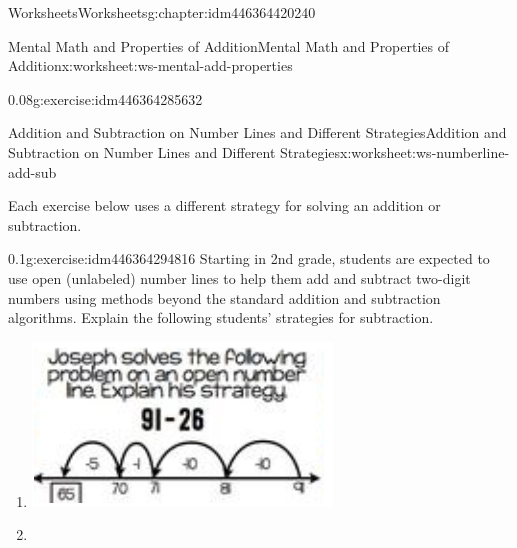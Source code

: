 \documentclass[twoside,11pt,]{book}
\begin{document}
\begin{chapterptx}{Worksheets}{}{Worksheets}{}{}{g:chapter:idm446364420240}
\begin{worksheet-section-numberless}{Mental Math and Properties of Addition}{}{Mental Math and Properties of Addition}{}{}{x:worksheet:ws-mental-add-properties}
\begin{divisionexercise}{6}{}{0.08}{g:exercise:idm446364285632}
%
\end{divisionexercise}%
\end{worksheet-section-numberless}
\restoregeometry
%
%
\typeout{************************************************}
\typeout{************************************************}
%
\begin{worksheet-section-numberless}{Addition and Subtraction on Number Lines and Different Strategies}{}{Addition and Subtraction on Number Lines and Different Strategies}{}{}{x:worksheet:ws-numberline-add-sub}
\begin{introduction}{}%
Each exercise below uses a different strategy for solving an addition or subtraction.%
\end{introduction}%
\begin{divisionexercise}{1}{}{0.1}{g:exercise:idm446364294816}%
Starting in 2nd grade, students are expected to use open (unlabeled) number lines to help them add and subtract two-digit numbers using methods beyond the standard addition and subtraction algorithms.   Explain the following students’ strategies for subtraction.%
%
\begin{enumerate}[label=(\alph*)]
\item{} \begin{image}{0}{1}{0}%
\includegraphics[width=1\linewidth]{images/numberline-add-sub-1a.png}
\end{image}%
\item{} \begin{image}{0}{1}{0}%

\end{image}
\end{enumerate}
\end{divisionexercise}
\end{worksheet-section-numberless}
\end{chapterptx}
\end{document}
